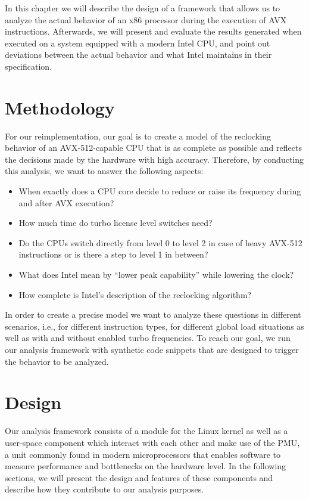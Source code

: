 In this chapter we will describe the design of a framework that allows us to analyze the actual behavior of an x86 processor during the execution of \gls{AVX} instructions. Afterwards, we will present and evaluate the results generated when executed on a system equipped with a modern Intel \gls{CPU}, and point out deviations between the actual behavior and what Intel maintains in their specification.

\section{Methodology}
\label{sec:analysis:methodology}

For our reimplementation, our goal is to create a model of the reclocking behavior of an \gls{AVX-512}-capable \gls{CPU} that is as complete as possible and reflects the decisions made by the hardware with high accuracy. Therefore, by conducting this analysis, we want to answer the following aspects:

\begin{itemize}
	\item When exactly does a \gls{CPU} core decide to reduce or raise its frequency during and after \gls{AVX} execution?
	\item How much time do turbo license level switches need?
	\item Do the \glspl{CPU} switch directly from level 0 to level 2 in case of heavy \gls{AVX-512} instructions or is there a step to level 1 in between?
	\item What does Intel mean by \enquote{lower peak capability} while lowering the clock?
	\item How complete is Intel's description of the reclocking algorithm?
\end{itemize}

In order to create a precise model we want to analyze these questions in different scenarios, i.e., for different instruction types, for different global load situations as well as with and without enabled turbo frequencies. To reach our goal, we run our analysis framework with synthetic code snippets that are designed to trigger the behavior to be analyzed.

\section{Design}
\label{sec:analysis:design}

Our analysis framework consists of a module for the \gls{Linux} kernel as well as a user-space component which interact with each other and make use of the \gls{PMU}, a unit commonly found in modern microprocessors that enables software to measure performance and bottlenecks on the hardware level. In the following sections, we will present the design and features of these components and describe how they contribute to our analysis purposes.

